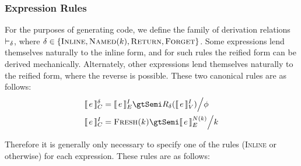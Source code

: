 \documentclass{article}
\begin{document}
    \subsubsection{Expression Rules}

    For the purposes of generating code, we define the family of derivation relations $\vdash_{\delta}$, where
    $\delta \in \{\textsc{Inline}, \textsc{Named$(k)$}, \textsc{Return}, \textsc{Forget}\}$. Some
    expressions lend themselves naturally to the inline form, and for such rules the reified form
    can be derived mechanically. Alternately, other expressions lend themselves naturally to the
    reified form, where the reverse is possible. These two canonical rules are as follows:
%
    \begin{align*}
        \intCD{e} &= \intEI{e} \gtSemi R_\delta(\intVI{e}) \with \phi \\
        \intCI{e} &= \Fresh{k} \gtSemi \intE{N(k)}{e} \with k \\
    \end{align*}

    Therefore it is generally only necessary to specify one of the rules (\textsc{Inline} or
    otherwise) for each expression. These rules are as follows:
\end{document}
